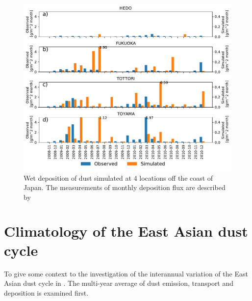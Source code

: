 \begin{figure}[hptb]
    \centering
    \includegraphics[width=\textwidth]{texfiles/figs/monthly_accumulated_wet_depostion_japan.pdf}
    \caption{Wet deposition of dust simulated at 4 locations off the coast of Japan. The measurements of monthly deposition flux are described by \textcite{osada2014wet}}
    \label{fig:model_eval_wet_deposition}
\end{figure}

\section{Climatology of the East Asian dust cycle}\label{sec:result_average}
To give some context to the investigation of the interannual variation of the East Asian dust cycle in . The multi-year average of dust emission, transport and deposition is examined first. 
